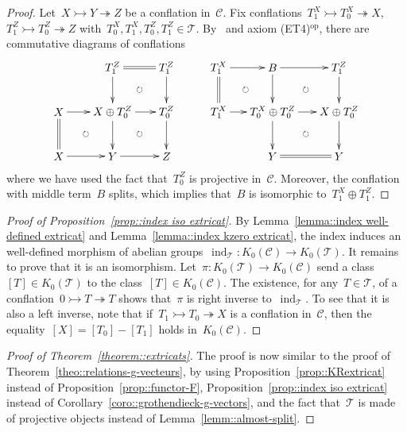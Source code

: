 \documentclass{amsart}
\theoremstyle{definition}
\newcommand{\cat}{\mathcal{C}}
\newcommand{\ind}{\operatorname{ind}}
\newcommand{\tc}{\mathcal{T}}
\newcommand{\infl}{\rightarrowtail}
\newcommand{\defl}{\twoheadrightarrow}
\newcommand{\kzero}[1]{K_0(#1)}
\begin{document}
\begin{proof}
Let~$X\infl Y\defl Z$ be a conflation in~$\cat$.
Fix conflations~$T_1^X \infl T_0^X \defl X$,~$T_1^Z\infl T_0^Z \defl Z$ with~$T_0^X, T_1^X, T_0^Z, T_1^Z\in\tc$.
By~\cite[Proposition 3.15]{NakaokaPalu} and axiom (ET4)$^{\mathrm{op}}$, there are commutative diagrams of conflations
\[
\xy
%
(-7,21)*+{T^Z_1}="-12";
(10,21)*+{T^Z_1}="-14";
%
(-24,7)*+{X}="0";
(-7,7)*+{X\oplus T^Z_0}="2";
(10,7)*+{T^Z_0}="4";
%
(-24,-7)*+{X}="10";
(-7,-7)*+{Y}="12";
(10,-7)*+{Z}="14";
%
{\ar@{=} "-12";"-14"};
%
{\ar "-12";"2"};
{\ar "-14";"4"};
%
{\ar "0";"2"};
{\ar "2";"4"};
%
{\ar@{=} "0";"10"};
{\ar "2";"12"};
{\ar "4";"14"};
%
{\ar "10";"12"};
{\ar "12";"14"};
%
{\ar@{}|\circlearrowright "-12";"4"};
{\ar@{}|\circlearrowright "0";"12"};
{\ar@{}|\circlearrowright "2";"14"};
\endxy
\ \ \ \ \ \ \ \
\xy
(-24,21)*+{T^X_1}="0";
(-7,21)*+{B}="2";
(14,21)*+{T^Z_1}="4";
%
(-24,7)*+{T^X_1}="10";
(-7,7)*+{T^X_0\oplus T^Z_0}="12";
(14,7)*+{X\oplus T^Z_0}="14";
%
(-7,-7)*+{Y}="22";
(14,-7)*+{Y}="24";
%
%
{\ar "0";"2"};
{\ar "2";"4"};
%
{\ar@{=} "0";"10"};
{\ar "2";"12"};
{\ar "4";"14"};
%
{\ar "10";"12"};
{\ar "12";"14"};
%
{\ar "12";"22"};
{\ar "14";"24"};
%
{\ar@{=} "22";"24"};
%
{\ar@{}|\circlearrowright "0";"12"};
{\ar@{}|\circlearrowright "2";"14"};
{\ar@{}|\circlearrowright "12";"24"};
\endxy
\]
where we have used the fact that~$T_0^Z$ is projective in~$\cat$.
Moreover, the conflation with middle term~$B$ splits, which implies that~$B$ is isomorphic to~$T_1^X\oplus T_1^Z$.
\end{proof}

\begin{proof}[Proof of Proposition~\ref{prop::index iso extricat}]
 By Lemma~\ref{lemma::index well-defined extricat} and Lemma~\ref{lemma::index kzero extricat}, the index induces an well-defined morphism of abelian groups~$\ind_\tc:\kzero{\cat}\to\kzero{\tc}$.
 It remains to prove that it is an isomorphism.
 Let~$\pi:\kzero{\tc}\to\kzero{\cat}$ send a class~$[T]\in\kzero{\tc}$ to the class~$[T]\in\kzero{\cat}$.
 The existence, for any~$T\in\tc$, of a conflation~$0\infl T\defl T$ shows that~$\pi$ is right inverse to~$\ind_\tc$.
 To see that it is also a left inverse, note that if~$T_1\infl T_0\defl X$ is a conflation in~$\cat$, then the equality~$[X]=[T_0]-[T_1]$ holds in~$\kzero{\cat}$.
\end{proof}

\begin{proof}[Proof of Theorem~\ref{theorem::extricats}]
 The proof is now similar to the proof of Theorem~\ref{theo::relations-g-vecteurs}, by using Proposition~\ref{prop::KRextricat} instead of Proposition~\ref{prop::functor-F}, Proposition~\ref{prop::index iso extricat} instead of Corollary~\ref{coro::grothendieck-g-vectors}, and the fact that~$\tc$ is made of projective objects instead of Lemma~\ref{lemm::almost-split}.
\end{proof}
\end{document}
